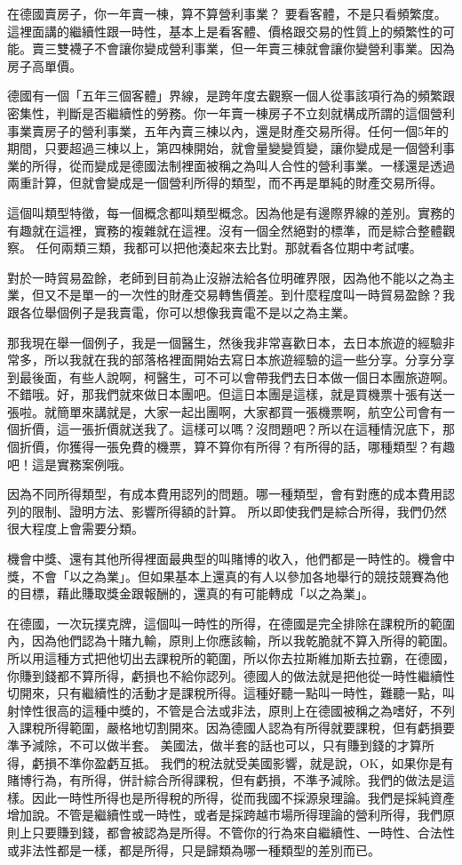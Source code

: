 \documentclass[oneside,sub3section]{ctexbook}
\begin{document}
在德國賣房子，你一年賣一棟，算不算營利事業？ 要看客體，不是只看頻繁度。這裡面講的繼續性跟一時性，基本上是看客體、價格跟交易的性質上的頻繁性的可能。賣三雙襪子不會讓你變成營利事業，但一年賣三棟就會讓你變營利事業。因為房子高單價。

德國有一個「五年三個客體」界線，是跨年度去觀察一個人從事該項行為的頻繁跟密集性，判斷是否繼續性的勞務。你一年賣一棟房子不立刻就構成所謂的這個營利事業賣房子的營利事業，五年內賣三棟以內，還是財產交易所得。任何一個5年的期間，只要超過三棟以上，第四棟開始，就會量變變質變，讓你變成是一個營利事業的所得，從而變成是德國法制裡面被稱之為叫人合性的營利事業。一樣還是透過兩重計算，但就會變成是一個營利所得的類型，而不再是單純的財產交易所得。

這個叫類型特徵，每一個概念都叫類型概念。因為他是有邊際界線的差別。實務的有趣就在這裡，實務的複雜就在這裡。沒有一個全然絕對的標準，而是綜合整體觀察。
任何兩類三類，我都可以把他湊起來去比對。那就看各位期中考試嘍。

對於一時貿易盈餘，老師到目前為止沒辦法給各位明確界限，因為他不能以之為主業，但又不是單一的一次性的財產交易轉售價差。到什麼程度叫一時貿易盈餘？我跟各位舉個例子是我賣電，你可以想像我賣電不是以之為主業。

那我現在舉一個例子，我是一個醫生，然後我非常喜歡日本，去日本旅遊的經驗非常多，所以我就在我的部落格裡面開始去寫日本旅遊經驗的這一些分享。分享分享到最後面，有些人說啊，柯醫生，可不可以會帶我們去日本做一個日本團旅遊啊。不錯哦。好，那我們就來做日本團吧。但這日本團是這樣，就是買機票十張有送一張啦。就簡單來講就是，大家一起出團啊，大家都買一張機票啊，航空公司會有一個折價，這一張折價就送我了。這樣可以嗎？沒問題吧？所以在這種情況底下，那個折價，你獲得一張免費的機票，算不算你有所得？有所得的話，哪種類型？有趣吧！這是實務案例哦。

因為不同所得類型，有成本費用認列的問題。哪一種類型，會有對應的成本費用認列的限制、證明方法、影響所得額的計算。
所以即使我們是綜合所得，我們仍然很大程度上會需要分類。

機會中獎、還有其他所得裡面最典型的叫賭博的收入，他們都是一時性的。機會中獎，不會「以之為業」。但如果基本上還真的有人以參加各地舉行的競技競賽為他的目標，藉此賺取獎金跟報酬的，還真的有可能轉成「以之為業」。

在德國，一次玩撲克牌，這個叫一時性的所得，在德國是完全排除在課稅所的範圍內，因為他們認為十賭九輸，原則上你應該輸，所以我乾脆就不算入所得的範圍。所以用這種方式把他切出去課稅所的範圍，所以你去拉斯維加斯去拉霸，在德國，你賺到錢都不算所得，虧損也不給你認列。德國人的做法就是把他從一時性繼續性切開來，只有繼續性的活動才是課稅所得。這種好聽一點叫一時性，難聽一點，叫射悻性很高的這種中獎的，不管是合法或非法，原則上在德國被稱之為嗜好，不列入課稅所得範圍，嚴格地切割開來。因為德國人認為有所得就要課稅，但有虧損要準予減除，不可以做半套。
美國法，做半套的話也可以，只有賺到錢的才算所得，虧損不準你盈虧互抵。
我們的稅法就受美國影響，就是說，OK，如果你是有賭博行為，有所得，併計綜合所得課稅，但有虧損，不準予減除。我們的做法是這樣。因此一時性所得也是所得稅的所得，從而我國不採源泉理論。我們是採純資產增加說。不管是繼續性或一時性，或者是採跨越市場所得理論的營利所得，我們原則上只要賺到錢，都會被認為是所得。不管你的行為來自繼續性、一時性、合法性或非法性都是一樣，都是所得，只是歸類為哪一種類型的差別而已。
\end{document}
